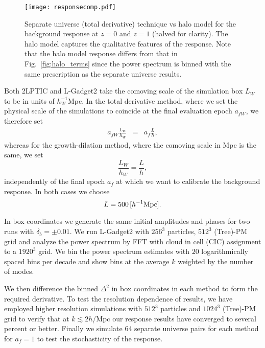 \documentclass[prd,twocolumn,amsmath,amssymb,floatfix,superscriptaddress]{revtex4-1}
\begin{document}
 
\begin{figure}[t]
    \centering
    \texttt{[image: responsecomp.pdf]}
    \caption{\footnotesize Separate universe (total derivative) technique vs halo model for the background response  at $z=0$ and $z=1$ (halved for clarity).  The halo model captures the qualitative features of the response.  Note that the halo model
    response differs from  that in Fig.~\ref{fig:halo_terms} since the power spectrum is binned with the same prescription as the separate universe results.}
    \label{fig:responsecomp}
\end{figure}



Both 2LPTIC and L-Gadget2 take the comoving scale of the simulation box $L_W$ to be in units of $h_W^{-1}$Mpc.   In the total derivative method, where we set the physical scale of the
simulations to coincide at the final evaluation epoch $a_{fW}$, we therefore set
\begin{eqnarray}
    a_{fW} \frac{L_{W}} {h_{W} }&=& a_f\frac{ L}{ h}, 
\end{eqnarray}
whereas for the growth-dilation method, where the comoving scale in Mpc is the same,
we set
\begin{equation}
    \frac{L_{W}} {h_{W}} = \frac{L}{ h},
\end{equation}
independently of the final epoch $a_f$ at which we want to calibrate the background
response.
In both cases we choose
\begin{equation}
    L = 500 \, [ h^{-1} {\rm Mpc} ].
\end{equation}

  In box coordinates we generate the same initial amplitudes and phases
for two runs with $\delta_b = \pm 0.01$.   We run L-Gadget2 with $256^3$ particles,
$512^3$  (Tree)-PM  grid and analyze the power spectrum by FFT with cloud in cell (CIC)
assignment to a $1920^3$ grid.   
{We bin the power spectrum estimates with $20$ logarithmically spaced bins per decade and show bins at the average $k$ weighted by the number of modes.}


 We then difference the binned $\Delta^2$ in box coordinates 
in each method to form the required derivative.   {To test the resolution dependence
of results, we have employed higher resolution simulations with $512^3$ particles and $1024^3$ (Tree)-PM grid to verify that at 
 $k \lesssim 2 h$/Mpc our response results have converged to several percent or better.}   Finally we simulate 64 separate universe pairs for each method for $a_{f}=1$
 to test the stochasticity of the
response.
\end{document}
